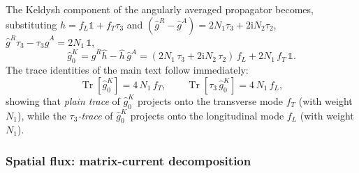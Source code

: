 \documentclass[
  aps,
  prb,
  preprint,
  superscriptaddress,
  longbibliography,
  nofootinbib
]{revtex4-2}
\newcommand{\ii}{\mathrm{i}}
\newcommand{\Tr}{\operatorname{Tr}}
\newcommand{\DOS}{N_1}
\newcommand{\fL}{f_L}
\newcommand{\fT}{f_T}
\newcommand{\hatg}{\hat{g}}
\providecommand{\openone}{}\renewcommand{\openone}{\mathds{1}}
\begin{document}
The Keldysh component of the angularly averaged propagator becomes,
substituting \(h=\fL\openone+\fT\tau_3\) and
\((\hatg^{R}-\hatg^{A})=2\DOS\tau_3+2\ii N_2\tau_2\),
\(\hatg^{R}\tau_3-\tau_3\hatg^{A}=2\DOS\,\openone\),
\begin{equation}
  \hatg_0^{K}
  =
  \hatg^{R}\hat h - \hat h\,\hatg^{A}
  =
  (2\DOS\,\tau_3+2\ii N_2\,\tau_2)\,\fL
  + 2\DOS\,\fT\,\openone .
  \label{eq:gK_BCS_h}
\end{equation}
The trace identities of the main text follow immediately:
\begin{equation}
  \Tr[\hatg_0^{K}] = 4\,\DOS\,\fT,
  \qquad
  \Tr[\tau_3\,\hatg_0^{K}] = 4\,\DOS\,\fL,
  \label{eq:trace_identities}
\end{equation}
showing that \emph{plain trace} of \(\hatg_0^K\) projects onto the
transverse mode \(\fT\) (with weight \(\DOS\)), while the
\emph{\(\tau_3\)-trace} of \(\hatg_0^K\) projects onto the longitudinal
mode \(\fL\) (with weight \(\DOS\)).

\subsubsection{Spatial flux: matrix-current decomposition}
\label{sec:matrix_current}
\end{document}
